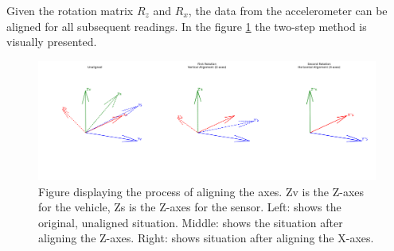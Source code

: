 Given the rotation matrix $R_z$ and $R_x$, the data from the accelerometer can be aligned for all subsequent readings. In the figure \ref{fig:align-vectors} the two-step method is visually presented.


\begin{figure}[H]
\begin{center}
\includegraphics[width=\textwidth,keepaspectratio]{images/4_data/accelerometer-alignment.png}
\end{center}
\caption{Figure displaying the process of aligning the axes. Zv is the Z-axes for the vehicle, Zs is the Z-axes for the sensor. Left: shows the original, unaligned situation. Middle: shows the situation after aligning the Z-axes. Right: shows situation after aligning the X-axes.}
\label{fig:align-vectors}
\end{figure}


 

